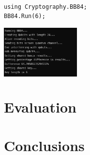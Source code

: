 \documentclass{article}
\begin{document}
\begin{lstlisting}[language={[Sharp]C}, caption={C\# Driver code sets the key length to 6}, label={Script}]

using Cryptography.BB84;
BB84.Run(6);

\end{lstlisting}

\includegraphics[width=0.3\textwidth]{BB84Output.jpg}


\section{Evaluation}

\section{Conclusions}

\printbibliography
\end{document}
